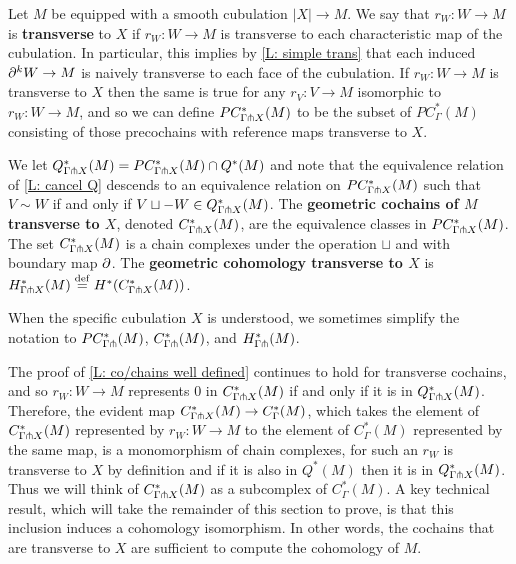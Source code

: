 \begin{definition}
	Let $M$ be equipped with a smooth cubulation $|X| \to M$.
	We say that $r_W \colon W \to M$ is \textbf{transverse} to $X$ if $r_W \colon W \to M$ is transverse to each characteristic map of the cubulation.
	In particular, this implies by \cref{L: simple trans} that each induced $\partial^kW \to M$ is naively transverse to each face of the cubulation.
	If $r_W \colon W \to M$ is transverse to $X$ then the same is true for any $r_V \colon V \to M$ isomorphic to $r_W \colon W \to M$, and so we can define $PC^*_{\Gamma \pitchfork X}(M)$ to be the subset of $PC^*_{\Gamma}(M)$ consisting of those precochains with reference maps transverse to $X$.

	We let $Q^*_{\Gamma \pitchfork X}(M) = PC_{\Gamma \pitchfork X}^*(M) \cap Q^*(M)$ and note that the equivalence relation of \cref{L: cancel Q} descends to an equivalence relation on $PC_{\Gamma \pitchfork X}^*(M)$ such that $V\sim W$ if and only if $V \sqcup -W \in Q^*_{\Gamma \pitchfork X}(M)$.
	The \textbf{geometric cochains of $M$ transverse to $X$}, denoted $C_{\Gamma \pitchfork X}^*(M)$, are the equivalence classes in $PC_{\Gamma \pitchfork X}^*(M)$.
	The set $C_{\Gamma \pitchfork X}^*(M)$ is a chain complexes under the operation $\sqcup$ and with boundary map $\partial$.
	The \textbf{geometric cohomology transverse to $X$} is $H_{\Gamma \pitchfork X}^*(M) \stackrel{\mathrm{def}}{=} H^*(C_{\Gamma \pitchfork X}^*(M))$.

	When the specific cubulation $X$ is understood, we sometimes simplify the notation to $PC_{\Gamma\pitchfork}^*(M)$, $C_{\Gamma\pitchfork}^*(M)$, and $H_{\Gamma\pitchfork}^*(M)$.
\end{definition}

The proof of \cref{L: co/chains well defined} continues to hold for transverse cochains, and so $r_W \colon W \to M$ represents $0$ in $C^*_{\Gamma \pitchfork X}(M)$ if and only if it is in $Q^*_{\Gamma \pitchfork X}(M)$.
Therefore, the evident map $C^*_{\Gamma \pitchfork X}(M) \to C^*_\Gamma(M)$, which takes the element of $C^*_{\Gamma \pitchfork X}(M)$ represented by $r_W \colon W \to M$ to the element of $C^*_\Gamma(M)$ represented by the same map, is a monomorphism of chain complexes, for such an $r_W$ is transverse to $X$ by definition and if it is also in $Q^*(M)$ then it is in $Q^*_{\Gamma \pitchfork X}(M)$.
Thus we will think of $C^*_{\Gamma \pitchfork X}(M)$ as a subcomplex of $C^*_\Gamma(M)$.
A key technical result, which will take the remainder of this section to prove,
is that this inclusion induces a cohomology isomorphism.
In other words, the cochains that are transverse to $X$ are sufficient to compute the cohomology of $M$.

